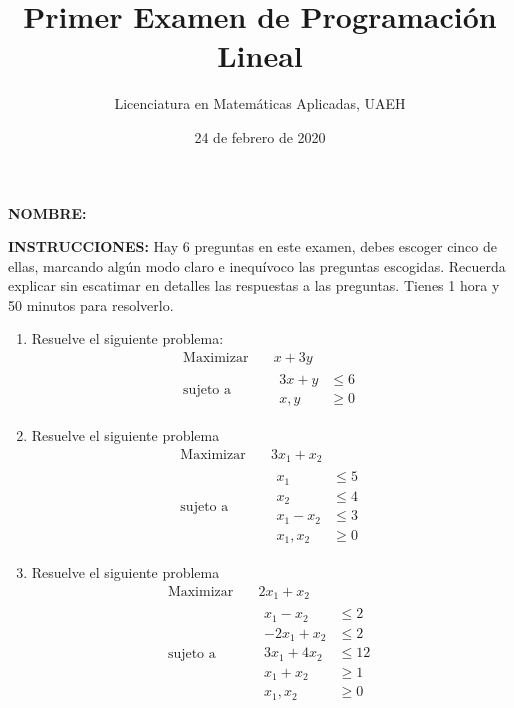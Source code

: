 \documentclass[twocolumn]{article}
\author{Licenciatura en Matemáticas Aplicadas, UAEH}
\date{24 de febrero de 2020}
\title{Primer Examen de Programación Lineal}
\begin{document}
\maketitle
\thispagestyle{empty}

\textbf{NOMBRE:}
\hrulefill

\medskip

\textbf{INSTRUCCIONES:} Hay 6 preguntas en este examen, debes escoger cinco
de ellas, marcando algún modo claro e inequívoco las preguntas
escogidas. Recuerda explicar sin escatimar en detalles las respuestas
a las preguntas. Tienes 1 hora y 50 minutos para resolverlo.

\begin{enumerate}
\item Resuelve el siguiente problema:
\begin{equation*}
\begin{aligned}
\text{Maximizar} \quad & x+3y\\
\text{sujeto a} \quad &
  \begin{aligned}
   3x+y &\leq 6\\
   x,y &\geq  0
  \end{aligned}
\end{aligned}
\end{equation*}

\item Resuelve el siguiente problema 
\begin{equation*}
 \begin{aligned}
\text{Maximizar} \quad & 3x_{1}+x_{2}\\
\text{sujeto a} \quad &
  \begin{aligned}
   x_{1} &\leq 5\\
   x_{2} &\leq 4\\
   x_{1}-x_{2} &\leq 3\\
    x_{1},x_{2} &\geq 0
  \end{aligned}
\end{aligned}
\end{equation*}

\item Resuelve el siguiente problema 
\begin{equation*}
 \begin{aligned}
\text{Maximizar} \quad & 2x_{1}+x_{2}\\
\text{sujeto a} \quad &
  \begin{aligned}
   x_{1}-x_{2} &\leq 2\\
   -2x_{1}+x_{2} &\leq 2\\
   3x_{1}+4x_{2} &\leq 12\\
   x_{1}+x_{2} &\geq 1\\
    x_{1},x_{2} &\geq 0
  \end{aligned}
\end{aligned}
\end{equation*}


\end{enumerate}
\end{document}
